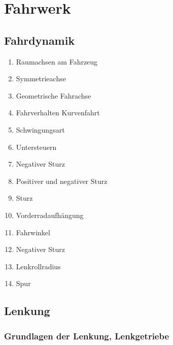 \section{Fahrwerk}\label{fahrwerk}

\subsection{Fahrdynamik}\label{fahrdynamik}

\begin{enumerate}
\item
  Raumachsen am Fahrzeug\\
\item
  Symmetrieachse\\
\item
  Geometrische Fahrachse\\
\item
  Fahrverhalten Kurvenfahrt\\
\item
  Schwingungsart\\
\item
  Untersteuern\\
\item
  Negativer Sturz\\
\item
  Positiver und negativer Sturz\\
\item
  Sturz\\
\item
  Vorderradaufhängung\\
\item
  Fahrwinkel\\
\item
  Negativer Sturz\\
\item
  Lenkrollradius\\
\item
  Spur
\end{enumerate}

\subsection{Lenkung}\label{lenkung}

\subsubsection{Grundlagen der Lenkung,
Lenkgetriebe}\label{grundlagen-der-lenkung-lenkgetriebe}

